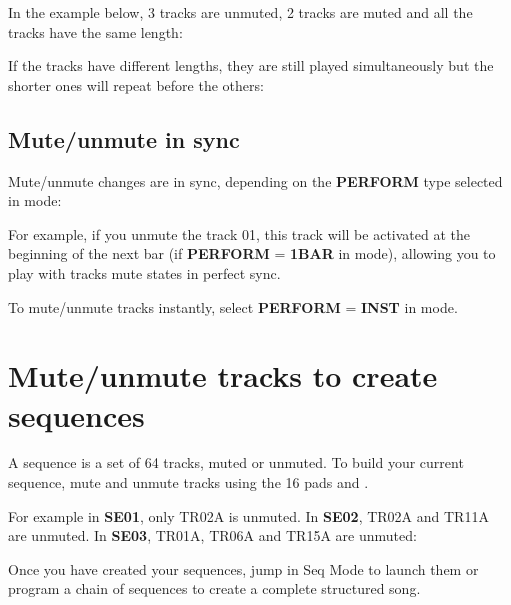 In the example below, 3 tracks are unmuted, 2 tracks are muted and all the tracks have the same length:


If the tracks have different lengths, they are still played simultaneously but the shorter ones will repeat before the others:



\subsection{Mute/unmute in sync}

Mute/unmute changes are in sync, depending on the \textbf{PERFORM} type selected in  mode:


For example, if you unmute the track 01, this track will be activated at the beginning of the next bar (if \textbf{PERFORM} = \textbf{1BAR} in  mode), allowing you to play with tracks mute states in perfect sync.

To mute/unmute tracks instantly, select \textbf{PERFORM} = \textbf{INST} in  mode.



\section{Mute/unmute tracks to create sequences}

A sequence is a set of 64 tracks, muted or unmuted. To build your current sequence, mute and unmute tracks using the 16 pads \padsicon{} and \btn{<} \btn{>}.

For example in \textbf{SE01}, only TR02A is unmuted. In \textbf{SE02}, TR02A and TR11A are unmuted. In \textbf{SE03}, TR01A, TR06A and TR15A are unmuted:


Once you have created your sequences, jump in Seq Mode to launch them or program a chain of sequences to create a complete structured song.

